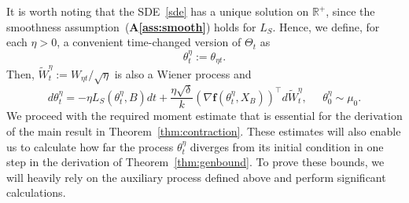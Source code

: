 \documentclass{article}
\begin{document}
It is worth noting that the SDE~\eqref{sde} has a unique solution on $\mathbb{R}^+$, since the smoothness assumption~(\textbf{A\ref{ass:smooth}}) holds for $L_S$. Hence, we define, for each $\eta >0$, a convenient time-changed version of $\Theta_t$ as $$\theta_t^\eta := \theta_{\eta t}.$$Then, $\tilde{W}_t^\eta := W_{\eta t} / \sqrt{\eta}$ is also a Wiener process and
$$
	d\theta_t^\eta = -\eta L_S(\theta_t^\eta, B) dt+  \frac{\eta \sqrt{\delta}}{k} \left( \nabla \textbf{f}(\theta_t^\eta, X_B)\right)^\top d\tilde{W}_t^\eta, \;\;\;\;\; \theta_0^\eta \sim \mu_0.
$$
We proceed with the required moment estimate that is essential for the derivation of the main result in Theorem~\ref{thm:contraction}.  These estimates will also enable us to calculate how far the process $\theta_t^\eta$ diverges from its initial condition in one step in the derivation of Theorem~\ref{thm:genbound}. To prove these bounds, we will heavily rely on the auxiliary process defined above and perform significant calculations.
\end{document}
